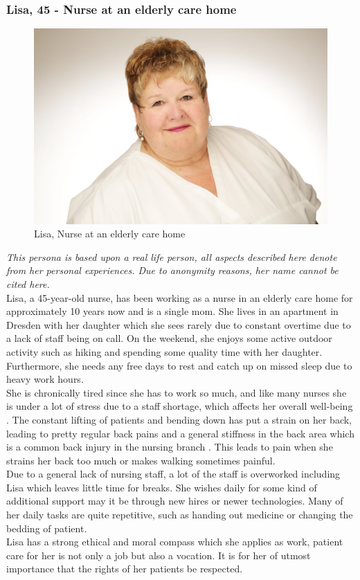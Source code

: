 \documentclass[plainarticle,zihtitle,english,final,hyperref,utf8]{zihpub}
\begin{document}
\subsubsection{Lisa, 45 - Nurse at an elderly care home}
\label{sec:lisa}
\begin{figure}[h!]
  \begin{center}
    \includegraphics[width=.6\textwidth]{Lisa.jpg}
    \caption{Lisa, Nurse at an elderly care home \cite{lisa}}
    \label{fig:lisa}
  \end{center}
\end{figure}
\emph{This persona is based upon a real life person, all aspects described here denote from her personal experiences. Due to anonymity reasons, her name cannot be cited here.}\\
\newline
Lisa, a 45-year-old nurse, has been working as a nurse in an elderly care home for approximately 10 years now and is a single mom. She lives in an apartment in Dresden with her daughter which she sees rarely due to constant overtime due to a lack of staff being on call. On the weekend, she enjoys some active outdoor activity such as hiking and spending some quality time with her daughter. Furthermore, she needs any free days to rest and catch up on missed sleep due to heavy work hours. \\
\newline
She is chronically tired since she has to work so much, and like many nurses she is under a lot of stress due to a staff shortage, which affects her overall well-being \cite{shapiro2001nurses}. The constant lifting of patients and bending down has put a strain on her back, leading to pretty regular back pains and a general stiffness in the back area which is a common back injury in the nursing branch \cite{doi:10.1002/nur.4770100106}. 
This leads to pain when she strains her back too much or makes walking sometimes painful.\\
\newline
Due to a general lack of nursing staff, a lot of the staff is overworked including Lisa which leaves little time for breaks. She wishes daily for some kind of additional support may it be through new hires or newer technologies. Many of her daily tasks are quite repetitive, such as handing out medicine or changing the bedding of patient.\\
\newline
Lisa has a strong ethical and moral compass which she applies as work, patient care for her is not only a job but also a vocation. It is for her of utmost importance that the rights of her patients be respected.\\
\end{document}
